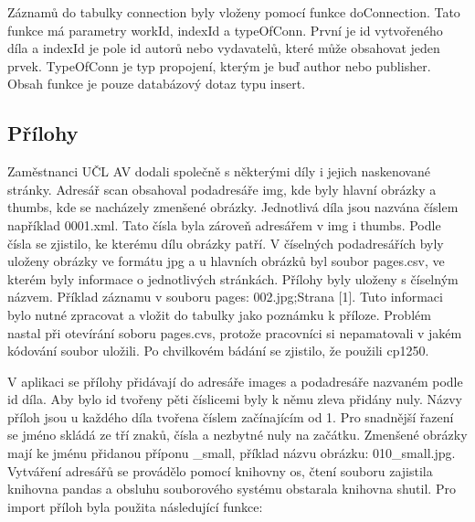             Záznamů do tabulky connection byly vloženy pomocí funkce doConnection. Tato funkce má parametry workId, indexId a typeOfConn. První je id vytvořeného díla a indexId je pole id autorů nebo vydavatelů, které může obsahovat jeden prvek. TypeOfConn je typ propojení, kterým je buď author nebo publisher. Obsah funkce je pouze databázový dotaz typu insert.
            
        \subsection{Přílohy}
            Zaměstnanci UČL AV dodali společně s některými díly i jejich naskenované stránky. Adresář scan obsahoval  podadresáře img, kde byly hlavní obrázky a thumbs, kde se nacházely zmenšené obrázky. Jednotlivá díla jsou nazvána číslem například 0001.xml. Tato čísla byla zároveň adresářem v img i thumbs. Podle čísla se zjistilo, ke kterému dílu obrázky patří. V číselných podadresářích byly uloženy obrázky ve formátu jpg a u hlavních obrázků byl soubor pages.csv, ve kterém byly informace o jednotlivých stránkách. Přílohy byly uloženy s číselným názvem. Příklad záznamu v souboru pages: 002.jpg;Strana [1]. Tuto informaci bylo nutné zpracovat a vložit do tabulky jako poznámku k příloze. Problém nastal při otevírání soboru pages.cvs, protože pracovníci si nepamatovali v jakém kódování soubor uložili. Po chvilkovém bádání se zjistilo, že použili cp1250. 
            
            V aplikaci se přílohy přidávají do adresáře images a podadresáře nazvaném podle id díla. Aby bylo id tvořeny pěti číslicemi byly k němu zleva přidány nuly. Názvy příloh jsou u každého díla tvořena číslem začínajícím od 1. Pro snadnější řazení se jméno skládá ze tří znaků, čísla a nezbytné nuly na začátku. Zmenšené obrázky mají ke jménu přidanou příponu \_small, příklad názvu obrázku: 010\_small.jpg. Vytváření adresářů se provádělo pomocí knihovny os, čtení souboru zajistila knihovna pandas a obsluhu souborového systému obstarala knihovna shutil. Pro import příloh byla použita následující funkce:

